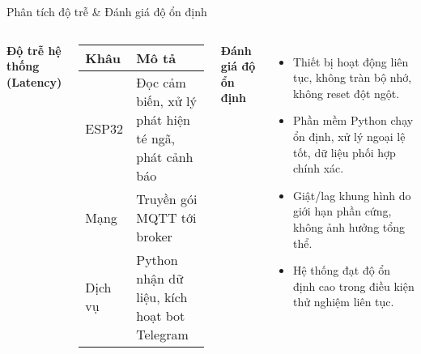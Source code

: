 
\begin{frame}{Phân tích độ trễ & Đánh giá độ ổn định}
\begin{columns}[T]
    \textbf{Độ trễ hệ thống (Latency)}
    \begin{tabular}{@{}ll@{}}
    \toprule
    \textbf{Khâu} & \textbf{Mô tả} \\
    \midrule
    ESP32 & Đọc cảm biến, xử lý phát hiện té ngã, phát cảnh báo \\
    Mạng & Truyền gói MQTT tới broker \\
    Dịch vụ & Python nhận dữ liệu, kích hoạt bot Telegram \\
    \bottomrule
    \end{tabular}

    \textbf{Đánh giá độ ổn định}
    \begin{itemize}
        \item Thiết bị hoạt động liên tục, không tràn bộ nhớ, không reset đột ngột.
        \item Phần mềm Python chạy ổn định, xử lý ngoại lệ tốt, dữ liệu phối hợp chính xác.
        \item Giật/lag khung hình do giới hạn phần cứng, không ảnh hưởng tổng thể.
        \item Hệ thống đạt độ ổn định cao trong điều kiện thử nghiệm liên tục.
    \end{itemize}
\end{columns}
\end{frame}
